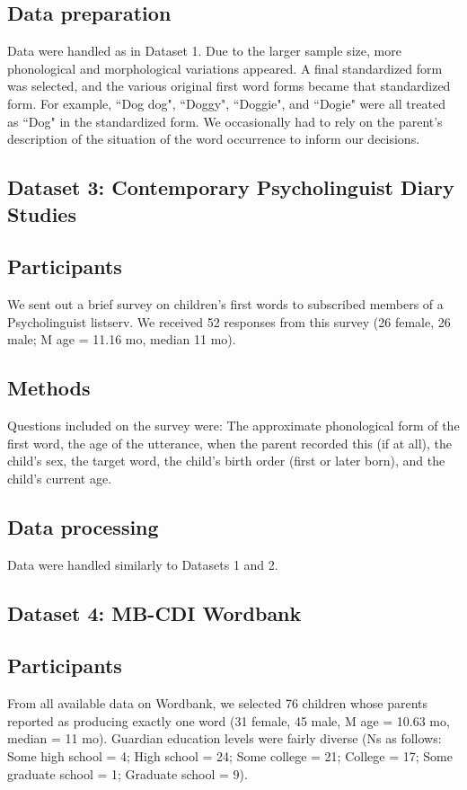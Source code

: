 \documentclass[10pt,letterpaper]{article}
\begin{document}
\subsection{Data preparation}
Data were handled as in Dataset 1. Due to the larger sample size, more phonological and morphological variations appeared. A final standardized form was selected, and the various original first word forms became that standardized form. For example,  ``Dog dog", ``Doggy", ``Doggie", and ``Dogie" were all treated as ``Dog" in the standardized form. We occasionally had to rely on the parent's description of the situation of the word occurrence to inform our decisions.

\subsection{Dataset 3: Contemporary Psycholinguist Diary Studies}

\subsection{Participants}
We sent out a brief survey on children's first words to subscribed members of a Psycholinguist listserv. We received 52 responses from this survey (26 female, 26 male; M age = 11.16 mo, median 11 mo).

\subsection{Methods}
Questions included on the survey were: The approximate phonological form of the first word, the age of the utterance, when the parent recorded this (if at all), the child's sex, the target word, the child's birth order (first or later born), and the child's current age. 

 \subsection{Data processing}
Data were handled similarly to Datasets 1 and 2. 

\subsection{Dataset 4: MB-CDI Wordbank}

\subsection{Participants}
From all available data on Wordbank, we selected 76 children whose parents reported as producing exactly one word (31 female, 45 male, M age = 10.63 mo, median = 11 mo). Guardian education levels were fairly diverse (Ns as follows: Some high school = 4; High school = 24; Some college = 21; College = 17; Some graduate school = 1; Graduate school = 9). 
\end{document}
